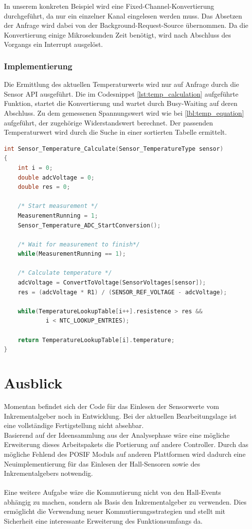 In unserem konkreten Beispiel wird eine Fixed-Channel-Konvertierung durchgeführt, da nur ein einzelner Kanal eingelesen werden muss. Das Absetzen der Anfrage wird dabei von der Background-Request-Source übernommen. Da die Konvertierung einige Mikrosekunden Zeit benötigt, wird nach Abschluss des Vorgangs ein Interrupt ausgelöst.

\subsubsection{Implementierung}
Die Ermittlung des aktuellen Temperaturwerts wird nur auf Anfrage durch die Sensor API ausgeführt. Die im Codesnippet \ref{lst:temp_calculation} aufgeführte Funktion, startet die Konvertierung und wartet durch Busy-Waiting auf deren Abschluss. Zu dem gemessenen Spannungswert wird wie bei \ref{lbl:temp_equation} aufgeführt, der zugehörige Widerstandswert berechnet. Der passenden Temperaturwert wird durch die Suche in einer sortierten Tabelle ermittelt.

\begin{lstlisting}[frame=single, language=c, caption=Temperaturberechnung, label=lst:temp_calculation]
int Sensor_Temperature_Calculate(Sensor_TemperatureType sensor)
{
	int i = 0;
	double adcVoltage = 0;
	double res = 0;

	/* Start measurement */
	MeasurementRunning = 1;
	Sensor_Temperature_ADC_StartConversion();

	/* Wait for measurement to finish*/
	while(MeasurementRunning == 1);

	/* Calculate temperature */
	adcVoltage = ConvertToVoltage(SensorVoltages[sensor]);
	res = (adcVoltage * R1) / (SENSOR_REF_VOLTAGE - adcVoltage);

	while(TemperatureLookupTable[i++].resistence > res && 
			i < NTC_LOOKUP_ENTRIES);

	return TemperatureLookupTable[i].temperature;
}
\end{lstlisting}

\section{Ausblick}
Momentan befindet sich der Code für das Einlesen der Sensorwerte vom Inkrementalgeber noch in Entwicklung. Bei der aktuellen Bearbeitungslage ist eine vollständige Fertigstellung nicht absehbar. \\
Basierend auf der Ideensammlung aus der Analysephase wäre eine mögliche Erweiterung dieses Arbeitspakets die Portierung auf andere Controller. Durch das mögliche Fehlend des POSIF Moduls auf anderen Plattformen wird dadurch eine Neuimplementierung für das Einlesen der Hall-Sensoren sowie des Inkrementalgebers notwendig. \\ \\
Eine weitere Aufgabe wäre die Kommutierung nicht von den Hall-Events abhängig zu machen, sondern als Basis den Inkrementalgeber zu verwenden. Dies ermöglicht die Verwendung neuer Kommutierungsstrategien und stellt mit Sicherheit eine interessante Erweiterung des Funktionsumfangs da.
